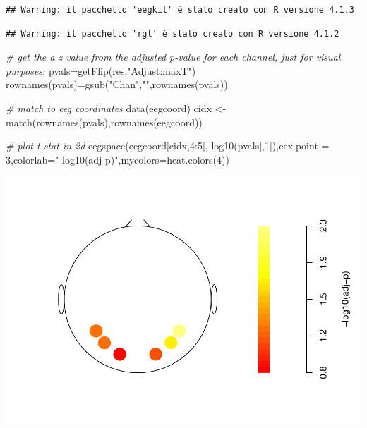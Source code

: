 \documentclass[
]{article}
\newenvironment{Shaded}{\begin{snugshade}}{\end{snugshade}}
\newcommand{\AttributeTok}[1]{\textcolor[rgb]{0.77,0.63,0.00}{#1}}
\newcommand{\CommentTok}[1]{\textcolor[rgb]{0.56,0.35,0.01}{\textit{#1}}}
\newcommand{\DecValTok}[1]{\textcolor[rgb]{0.00,0.00,0.81}{#1}}
\newcommand{\FunctionTok}[1]{\textcolor[rgb]{0.00,0.00,0.00}{#1}}
\newcommand{\NormalTok}[1]{#1}
\newcommand{\OtherTok}[1]{\textcolor[rgb]{0.56,0.35,0.01}{#1}}
\newcommand{\SpecialCharTok}[1]{\textcolor[rgb]{0.00,0.00,0.00}{#1}}
\newcommand{\StringTok}[1]{\textcolor[rgb]{0.31,0.60,0.02}{#1}}
\begin{document}
\begin{verbatim}
## Warning: il pacchetto 'eegkit' è stato creato con R versione 4.1.3
\end{verbatim}

\begin{verbatim}
## Warning: il pacchetto 'rgl' è stato creato con R versione 4.1.2
\end{verbatim}

\begin{Shaded}
\begin{Highlighting}[]
\CommentTok{\# get the a z value from the adjusted p{-}value for each channel, just for visual purposes:}
\NormalTok{pvals}\OtherTok{=}\FunctionTok{getFlip}\NormalTok{(res,}\StringTok{"Adjust:maxT"}\NormalTok{)}
\FunctionTok{rownames}\NormalTok{(pvals)}\OtherTok{=}\FunctionTok{gsub}\NormalTok{(}\StringTok{"Chan"}\NormalTok{,}\StringTok{""}\NormalTok{,}\FunctionTok{rownames}\NormalTok{(pvals))}

\CommentTok{\# match to eeg coordinates}
\FunctionTok{data}\NormalTok{(eegcoord)}
\NormalTok{cidx }\OtherTok{\textless{}{-}} \FunctionTok{match}\NormalTok{(}\FunctionTok{rownames}\NormalTok{(pvals),}\FunctionTok{rownames}\NormalTok{(eegcoord))}

\CommentTok{\# plot t{-}stat in 2d}
\FunctionTok{eegspace}\NormalTok{(eegcoord[cidx,}\DecValTok{4}\SpecialCharTok{:}\DecValTok{5}\NormalTok{],}\SpecialCharTok{{-}}\FunctionTok{log10}\NormalTok{(pvals[,}\DecValTok{1}\NormalTok{]),}\AttributeTok{cex.point =} \DecValTok{3}\NormalTok{,}\AttributeTok{colorlab=}\StringTok{"{-}log10(adj{-}p)"}\NormalTok{,}\AttributeTok{mycolors=}\FunctionTok{heat.colors}\NormalTok{(}\DecValTok{4}\NormalTok{))}
\end{Highlighting}
\end{Shaded}

\includegraphics{perm_repeated_measures_files/figure-latex/unnamed-chunk-16-1.pdf}
\end{document}
